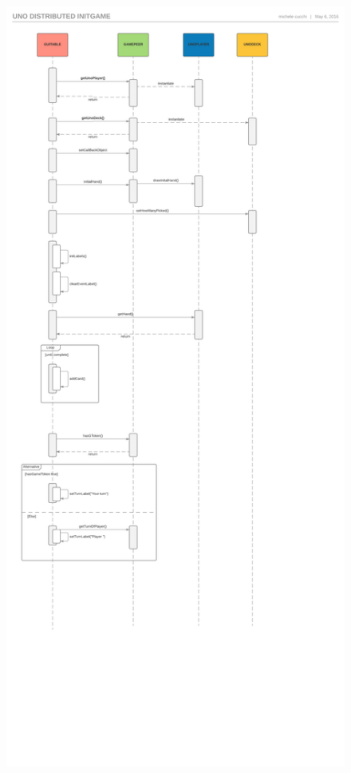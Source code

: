 \documentclass[10pt,a4paper]{article}
\begin{document}
\begin{figure}[H]
\begin{center}
\includegraphics[height=30cm, keepaspectratio]{initgame.png}
\end{center}
\end{figure}
\end{document}
